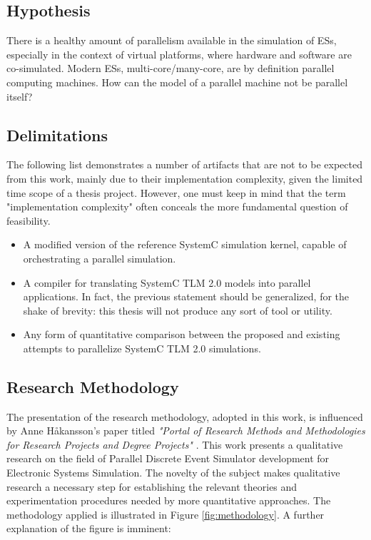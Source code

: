 \documentclass[11pt]{article}
\begin{document}
\subsection{Hypothesis}
\label{sec:org0062fd8}
There is a healthy amount of parallelism available in the simulation of ESs, especially in the context of virtual platforms, where hardware and software are co-simulated.
Modern ESs, multi-core/many-core, are by definition parallel computing machines.
How can the model of a parallel machine not be parallel itself?

\subsection{Delimitations}
\label{sec:orga1a8f66}
The following list demonstrates a number of artifacts that are not to be expected from this work, mainly due to their implementation complexity, given the limited time scope of a thesis project.
However, one must keep in mind that the term "implementation complexity" often conceals the more fundamental question of feasibility.

\begin{itemize}
\item A modified version of the reference SystemC simulation kernel, capable of orchestrating a parallel simulation.

\item A compiler for translating SystemC TLM 2.0 models into parallel applications. In fact, the previous statement should be generalized, for the shake of brevity:
this thesis will not produce any sort of tool or utility.

\item Any form of quantitative comparison between the proposed and existing attempts to parallelize SystemC TLM 2.0 simulations.
\end{itemize}

\subsection{Research Methodology}
\label{sec:org828dfdc}
The presentation of the research methodology, adopted in this work, is influenced by Anne Håkansson's paper titled \textit{"Portal of Research Methods and Methodologies for Research Projects and Degree Projects"} \cite{Hakansson2013}.
This work presents a qualitative research on the field of Parallel Discrete Event Simulator development for Electronic Systems Simulation.
The novelty of the subject makes qualitative research a necessary step for establishing the relevant theories and experimentation procedures needed by more quantitative approaches.
The methodology applied is illustrated in Figure \ref{fig:methodology}.
A further explanation of the figure is imminent:
\end{document}
